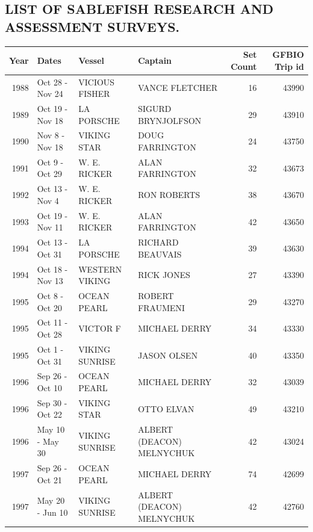 \documentclass[12pt]{article}\usepackage[]{graphicx}\usepackage[]{color}
\begin{document}
\begin{appendices}

\clearpage

\section{LIST OF SABLEFISH RESEARCH AND ASSESSMENT SURVEYS.}
\label{app:first-appendix}

\begingroup\fontsize{8}{10}\selectfont
\begin{longtable}{rlllrr}
\toprule
\textbf{Year} & \textbf{Dates} & \textbf{Vessel} & \textbf{Captain} & \textbf{Set Count} & \textbf{GFBIO Trip id}\\
\midrule
1988 & Oct 28  - Nov 24 & VICIOUS FISHER & VANCE FLETCHER & 16 & 43990\\
1989 & Oct 19  - Nov 18 & LA PORSCHE & SIGURD BRYNJOLFSON & 29 & 43910\\
1990 & Nov  8  - Nov 18 & VIKING STAR & DOUG FARRINGTON & 24 & 43750\\
1991 & Oct  9  - Oct 29 & W. E. RICKER & ALAN FARRINGTON & 32 & 43673\\
1992 & Oct 13  - Nov  4 & W. E. RICKER & RON ROBERTS & 38 & 43670\\
1993 & Oct 19  - Nov 11 & W. E. RICKER & ALAN FARRINGTON & 42 & 43650\\
1994 & Oct 13  - Oct 31 & LA PORSCHE & RICHARD BEAUVAIS & 39 & 43630\\
1994 & Oct 18  - Nov 13 & WESTERN VIKING & RICK JONES & 27 & 43390\\
1995 & Oct  8  - Oct 20 & OCEAN PEARL & ROBERT FRAUMENI & 29 & 43270\\
1995 & Oct 11  - Oct 28 & VICTOR F & MICHAEL DERRY & 34 & 43330\\
1995 & Oct  1  - Oct 31 & VIKING SUNRISE & JASON OLSEN & 40 & 43350\\
1996 & Sep 26  - Oct 10 & OCEAN PEARL & MICHAEL DERRY & 32 & 43039\\
1996 & Sep 30  - Oct 22 & VIKING STAR & OTTO ELVAN & 49 & 43210\\
1996 & May 10  - May 30 & VIKING SUNRISE & ALBERT (DEACON) MELNYCHUK & 42 & 43024\\
1997 & Sep 26  - Oct 21 & OCEAN PEARL & MICHAEL DERRY & 74 & 42699\\
1997 & May 20  - Jun 10 & VIKING SUNRISE & ALBERT (DEACON) MELNYCHUK & 42 & 42760\\

\end{longtable}
\end{appendices}
\end{document}

